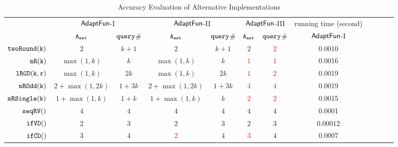 {\footnotesize
\begin {table}[H]
\vspace{-0.2cm}
    \caption{Accuracy Evaluation of {\THESYSTEM}  Alternative Implementations}
    \vspace{-0.2cm}
        \label{tb:adapt-imp-alternatives}
        \begin{center}
        \centering
{\tiny
        \begin{tabular}{ | >{\tiny}r | c | c | c | c | c | c | c | c | c | c | c |}
        \hline \hline
        \multirow{2}{*}{Program $c$}
         & \multicolumn{2}{c|}{$\textsf{AdaptFun}$-I}
         & \multicolumn{2}{c|}{$\textsf{AdaptFun}$-II}
         & \multicolumn{2}{c|}{$\textsf{AdaptFun}$-III}
         & {running time (second)} \\ 
         \cline{2-8}
         & {${\mathtt{A_{est}}}$ } & {${\tt query}$\# } & {${\mathtt{A_{est}}}$ } & {${\tt query}$\# } & {${\mathtt{A_{est}}}$ } & {${\tt query}$\# } & $\textsf{AdaptFun}$-I \\
         \cline{5-8}
         \hline \hline
         $  \mathtt{twoRound(k)}$ &  $2$    & $k+1 $  & $2$ & $k + 1$ & $2$ & \textcolor{red}{$2$} & 0.0010   \\
         $  \mathtt{mR(k)}$ &   $\max(1,k)$ & $k$  &  $\max(1,k)$ & $k$ & \textcolor{red}{$1$} & \textcolor{red}{$1$} & 0.0016 \\
         $  \mathtt{lRGD(k, r)}$ & $\max(1,k) $ & $ 2k $  &  $\max(1,k) $ & $ 2k $ & \textcolor{red}{$1$} & \textcolor{red}{$2$} & 0.0019   \\
         $  \mathtt{mROdd(k)}$  &  $2+\max(1,2k)  $ & $1 + 3 k $  &  $2+\max(1,2k)  $ & $1 + 3 k $  & \textcolor{red}{$4$} & \textcolor{red}{$4$} & 0.0019 \\
         $  \mathtt{mRSingle(k)}$    & $1+ \max(1, k) $ & $1 + k$  &  $1+ \max(1, k) $ & $k$ & \textcolor{red}{$2$} & \textcolor{red}{$2$} & 0.0015  \\
         $  \mathtt{seqRV()}$   & $4$ &   $4$  & $4$ & $4$ & $4$ & $4$ & 0.0001 \\
         $  \mathtt{ifVD()}$   & $2$ &   $3$  & $2$ & $3$ & $2$ & $3$ & 0.00012 \\
         $  \mathtt{ifCD()}$   & $3$ &   $4$  & \textcolor{red}{$2$} & $4$ & \textcolor{red}{$3$} & $4$ & 0.0007 \\

\end{tabular}}
\end{center}
\end{table}}
